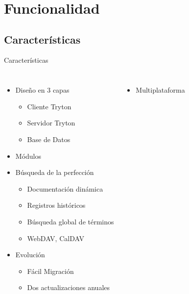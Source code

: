

\section{Funcionalidad}

    \subsection{Características}

    \begin{frame}{Características}
        \fontsize{10}{11}\selectfont
        \begin{columns}
    	\begin{itemize}
    		\item Diseño en 3 capas
    			\begin{itemize}
    				\item Cliente Tryton
    				\item Servidor Tryton
    				\item Base de Datos
    			\end{itemize}
    		\item Módulos
            \item Búsqueda de la perfección
			\begin{itemize}
                \item Documentación dinámica
                \item Registros históricos
				\item Búsqueda global de términos
				\item WebDAV, CalDAV
			\end{itemize}
            \item Evolución
                \begin{itemize}
                    \item Fácil Migración
                    \item Dos actualizaciones anuales
                \end{itemize}
    	\end{itemize}
        \begin{itemize}
            \item Multiplataforma

\end{itemize}
\end{columns}
\end{frame}
